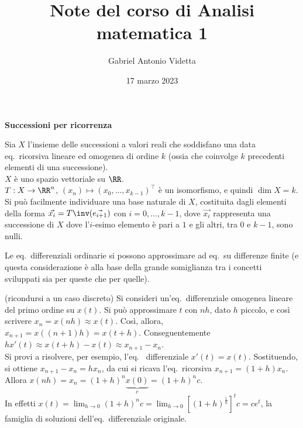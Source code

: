 \documentclass[11pt]{article}
\title{\textbf{Note del corso di Analisi matematica 1}}
\author{Gabriel Antonio Videtta}
\date{17 marzo 2023}
\begin{document}
\maketitle

\begin{center}
    \Large \textbf{Successioni per ricorrenza}
\end{center}

\begin{remark}
Sia $X$ l'insieme delle successioni a valori reali che soddisfano una data
eq.~ricorsiva lineare ed omogenea di ordine $k$ (ossia che coinvolge
$k$ precedenti elementi di una successione). \\

\li $X$ è uno spazio vettoriale su $\RR$. \\
\li $T : X \to \RR^n$, $(x_n) \mapsto (x_0, ..., x_{k-1})^\top$ è
un isomorfismo, e quindi $\dim X = k$. \\
\li Si può facilmente individuare una base naturale di $X$, costituita dagli
elementi della forma $\vec{x_i} = T\inv(\vec{e_ {i + 1}})$ con $i = 0, ..., k - 1$,
dove $\vec{x_i}$ rappresenta una successione di $X$ dove l'$i$-esimo elemento
è pari a $1$ e gli altri, tra $0$ e $k-1$, sono nulli.
\end{remark}

\begin{remark}
Le eq.~differenziali ordinarie si possono approssimare
ad eq.~su differenze finite (e questa considerazione è
alla base della grande somiglianza tra i concetti sviluppati
sia per queste che per quelle).
\end{remark}

\begin{example} (ricondursi a un caso discreto) 
Si consideri un'eq.~differenziale omogenea lineare del primo
ordine su $x(t)$. Si può approssimare $t$ con $nh$, dato
$h$ piccolo, e così scrivere $x_n = x(nh) \approx x(t)$.
Così, allora, $x_{n+1} = x((n+1)h) = x(t + h)$. Conseguentemente $h
x'(t) \approx x(t + h) - x(t) \approx x_{n+1} - x_n$. \\

Si provi a risolvere, per esempio, l'eq.~ differenziale $x'(t) = x(t)$.
Sostituendo, si ottiene $x_{n+1} - x_n = h x_n$, da cui
si ricava l'eq.~ricorsiva $x_{n+1} = (1 + h) x_n$. Allora
$x(nh) = x_n = (1 + h)^n \underbrace{x(0)}_c = (1 + h)^n c$. \\

In effetti $x(t) = \displaystyle \lim_{h \to 0} (1 + h)^n c =
\lim_{h \to 0} \left[(1 + h)^{\frac{1}{h}}\right]^t c = c e^t$,
la famiglia di soluzioni dell'eq.~differenziale originale.
\end{example}
\end{document}
